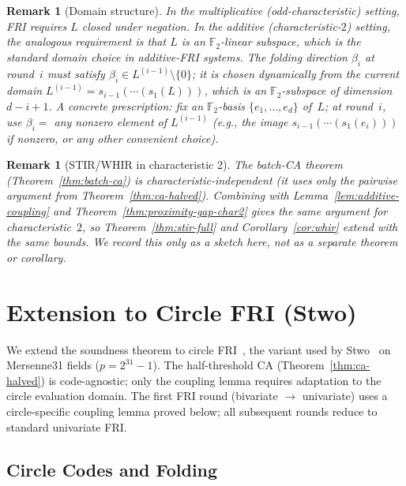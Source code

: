 \documentclass[11pt]{article}
\newtheorem{remark}[theorem]{Remark}
\newcommand{\FF}{\mathbb{F}}
\begin{document}
\begin{remark}[Domain structure]
\label{rem:char2-domain}
In the multiplicative (odd-characteristic) setting, FRI requires $L$ closed under negation. In the additive (characteristic-$2$) setting, the analogous requirement is that $L$ is an $\FF_2$-linear subspace, which is the standard domain choice in additive-FRI systems. The folding direction $\beta_i$ at round~$i$ must satisfy $\beta_i \in L^{(i-1)} \setminus \{0\}$; it is chosen dynamically from the current domain $L^{(i-1)} = s_{i-1}(\cdots(s_1(L)))$, which is an $\FF_2$-subspace of dimension $d{-}i{+}1$. A concrete prescription: fix an $\FF_2$-basis $\{e_1, \ldots, e_d\}$ of~$L$; at round~$i$, use $\beta_i = $ any nonzero element of $L^{(i-1)}$ (e.g., the image $s_{i-1}(\cdots(s_1(e_i)))$ if nonzero, or any other convenient choice).
\end{remark}

\begin{remark}[STIR/WHIR in characteristic 2]
\label{rem:stir-char2}
The batch-CA theorem (Theorem~\ref{thm:batch-ca}) is characteristic-independent (it uses only the pairwise argument from Theorem~\ref{thm:ca-halved}). Combining with Lemma~\ref{lem:additive-coupling} and Theorem~\ref{thm:proximity-gap-char2} gives the same argument for characteristic~$2$, so Theorem~\ref{thm:stir-full} and Corollary~\ref{cor:whir} extend with the same bounds. We record this only as a sketch here, not as a separate theorem or corollary.
\end{remark}


\section{Extension to Circle FRI (Stwo)}
\label{app:circle}

We extend the soundness theorem to circle FRI~\cite{CircleSTARKs}, the variant used by Stwo~\cite{StwoWhitepaper} on Mersenne31 fields ($p = 2^{31}-1$). The half-threshold CA (Theorem~\ref{thm:ca-halved}) is code-agnostic; only the coupling lemma requires adaptation to the circle evaluation domain. The first FRI round (bivariate $\to$ univariate) uses a circle-specific coupling lemma proved below; all subsequent rounds reduce to standard univariate FRI.

\subsection{Circle Codes and Folding}
\end{document}
